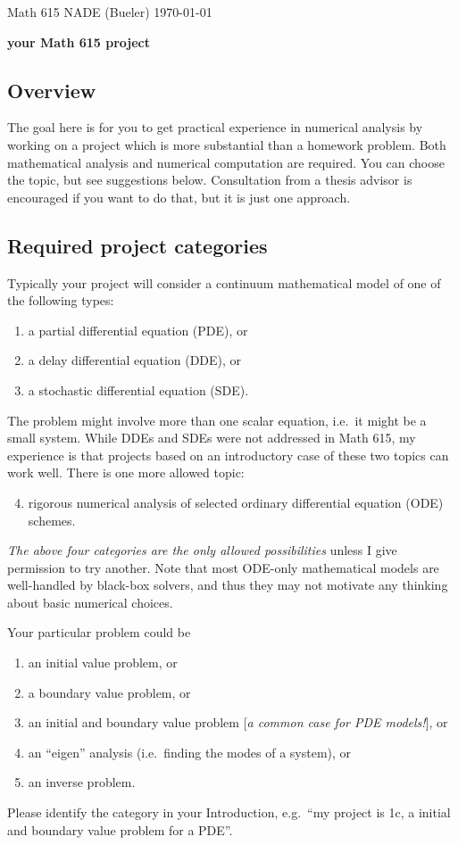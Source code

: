 \documentclass[11pt]{amsart}
\begin{document}
\scriptsize \noindent Math 615 NADE (Bueler) \hfill \today
\bigskip

\Large\centerline{\textbf{your Math 615 project}}
\normalsize

\thispagestyle{empty}

\bigskip

\subsection*{Overview}  The goal here is for you to get practical experience in numerical analysis by working on a project which is more substantial than a homework problem.  Both mathematical analysis and numerical computation are required.  You can choose the topic, but see suggestions below.  Consultation from a thesis advisor is encouraged if you want to do that, but it is just one approach.

\subsection*{Required project categories}  Typically your project will consider a continuum mathematical model of one of the following types:
\renewcommand{\labelenumi}{\arabic{enumi}.}
\begin{enumerate}
\item a partial differential equation (PDE), or
\item a delay differential equation (DDE), or
\item a stochastic differential equation (SDE).
\end{enumerate}
The problem might involve more than one scalar equation, i.e.~it might be a small system.  While DDEs and SDEs were not addressed in Math 615, my experience is that projects based on an introductory case of these two topics can work well.  There is one more allowed topic:
\begin{enumerate}
\setcounter{enumi}{3}
\item rigorous numerical analysis of selected ordinary differential equation (ODE) schemes.
\end{enumerate}

\emph{The above four categories are the only allowed possibilities} unless I give permission to try another.  Note that most ODE-only mathematical models are well-handled by black-box solvers, and thus they may not motivate any thinking about basic numerical choices.

Your particular problem could be
\renewcommand{\labelenumi}{\alph{enumi}.}
\begin{enumerate}
\item an initial value problem, or
\item a boundary value problem, or
\item an initial and boundary value problem [\emph{a common case for PDE models!}], or
\item an ``eigen'' analysis (i.e.~finding the modes of a system), or
\item an inverse problem.
\end{enumerate}
Please identify the category in your Introduction, e.g.~``my project is 1c, a initial and boundary value problem for a PDE''.
\end{document}
